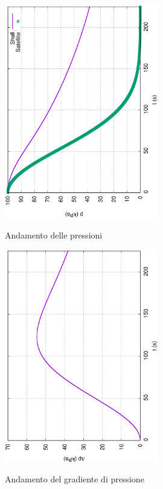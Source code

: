 \documentclass{article}
\begin{document}
        \begin{figure}[h!]
            \centering
            \includegraphics[width=0.6\textwidth, angle=-90]{MUL2/Esercitazione1/2C/p.eps}
            \label{fig:press_10_7} 
            \caption{Andamento delle pressioni}
        \end{figure}
        
        \begin{figure}[h!] 
            \centering
            \includegraphics[width=0.6\textwidth, angle=-90]{MUL2/Esercitazione1/2C/Dp.eps}
            \label{fig:grad_press_10_7}
            \caption{Andamento del gradiente di pressione}
        \end{figure}
\end{document}
